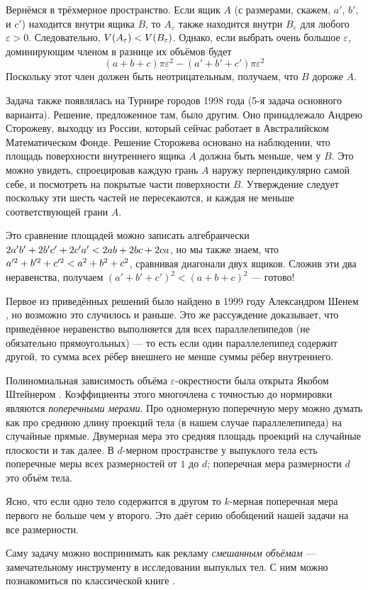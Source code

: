Вернёмся в трёхмерное пространство.
Если ящик $A$ (с размерами, скажем, $a'$, $b'$, и $c'$) находится внутри ящика $B$, то $A_\varepsilon$ также находится внутри $B_\varepsilon$ для любого $\varepsilon > 0$.
Следовательно, $V(A_\varepsilon ) \z< V(B_\varepsilon)$.
Однако, если выбрать очень большое $\varepsilon$, доминирующим членом в разнице их объёмов будет
\[(a+b+c)\pi\varepsilon^2-(a'+b'+c')\pi\varepsilon^2\]
Поскольку этот член должен быть неотрицательным, получаем, что $B$ дороже $A$.

Задача также появлялась на Турнире городов 1998 года (5-я задача основного варианта).
Решение, предложенное там, было другим.
Оно принадлежало Андрею Сторожеву, выходцу из России, который сейчас работает в Австралийском Математическом Фонде.
Решение Сторожева основано на наблюдении, что площадь поверхности внутреннего ящика $A$ должна быть меньше, чем у  $B$.
Это можно увидеть, спроецировав каждую грань $A$ наружу перпендикулярно самой себе, 
и посмотреть на покрытые части поверхности $B$.
Утверждение следует поскольку эти шесть частей не пересекаются, и каждая не меньше соответствующей грани $A$.

Это сравнение площадей можно записать алгебраически $2a'b'\z+2b'c'\z+2c'a' \z< 2ab\z+2bc\z+2ca$, но мы также знаем, что $a'^2\z+b'^2\z+c'^2\z<a^2\z+b^2\z+c^2$, сравнивая диагонали двух ящиков.
Сложив эти два неравенства, получаем 
$(a'+b'+c')^2<(a+b+c)^2$ --- готово!

\begin{addedbytheeditors}
Первое из приведённых решений было найдено в 1999 году Александром Шенем \cite{shen}, но возможно это случилось и раньше.
Это же рассуждение доказывает, что приведённое неравенство выполняется для всех параллелепипедов (не обязательно прямоугольных) --- то есть если один параллелепипед содержит другой, то сумма всех рёбер внешнего не менше суммы рёбер внутреннего.

Полиномиальная зависимость объёма $\varepsilon$-окрестности была открыта Якобом Штейнером \cite{steiner}.
Коэффициенты этого многочлена с точностью до нормировки являются \emph{поперечными мерами}.
Про одномерную поперечную меру можно думать как про среднюю длину проекций тела (в нашем случае параллелепипеда) на случайные прямые.
Двумерная мера это средняя площадь проекций на случайные плоскости и так далее.
В $d$-мерном пространстве у выпуклого тела есть поперечные меры всех размерностей от $1$ до $d$;
поперечная мера размерности $d$ это объём тела.

Ясно, что если одно тело содержится в другом то $k$-мерная поперечная мера первого не больше чем у второго.
Это даёт серию обобщений нашей задачи на все размерности.

Саму задачу можно воспринимать как рекламу \emph{смешанным объёмам} --- замечательному инструменту в исследовании выпуклых тел.
С ним можно познакомиться по классической книге \cite{burago-zalgaller}.
\end{addedbytheeditors}
